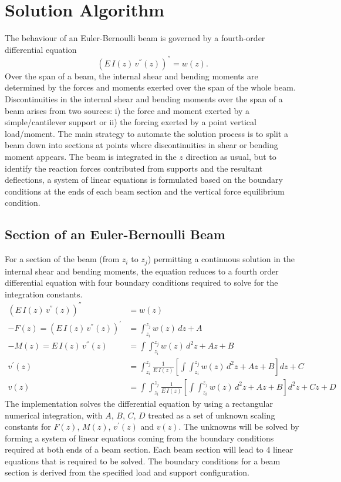 \documentclass[11pt,a4paper]{article}
\begin{document}
\section{Solution Algorithm}
The behaviour of an Euler-Bernoulli beam is governed by a fourth-order differential equation
\begin{equation*}
	\left( E \, I(z) \, v^{''}(z) \right)^{''} = w(z).
\end{equation*}
Over the span of a beam, the internal shear and bending moments are determined by the forces and moments exerted over the span of the whole beam. Discontinuities in the internal shear and bending moments over the span of a beam arises from two sources: i) the force and moment exerted by a simple/cantilever support or ii) the forcing exerted by a point vertical load/moment. The main strategy to automate the solution process is to split a beam down into sections at points where discontinuities in shear or bending moment appears. The beam is integrated in the $z$ direction as usual, but to identify the reaction forces contributed from supports and the resultant deflections, a system of linear equations is formulated based on the boundary conditions at the ends of each beam section and the vertical force equilibrium condition.
\subsection{Section of an Euler-Bernoulli Beam}
For a section of the beam (from $z_i$ to $z_j$) permitting a continuous solution in the internal shear and bending moments, the equation reduces to a fourth order differential equation with four boundary conditions required to solve for the integration constants.
\begin{align}
	 \left( E \, I(z) \, v^{''}(z) \right)^{''} & = w(z)\\
	-F(z) = \left( E \, I(z) \, v^{''}(z) \right)^{'} & = \int_{z_i}^{z_j} w(z) \, dz + A \\
	-M(z) = E \, I(z) \, v^{''}(z) & = \int \int_{z_i}^{z_j} w(z) \, d^2z + Az + B \\
	v^{'}(z) & = \int_{z_i}^{z_j} \frac{1}{E \, I(z)} \left[ \int \int_{z_i}^{z_j} w(z) \, d^2z + Az + B \right] dz  + C \\
	v(z) & = \int \int_{z_i}^{z_j} \frac{1}{E \, I(z)} \left[ \int \int_{z_i}^{z_j} w(z) \, d^2z + Az + B \right] d^2 z  + Cz + D
\end{align}
The implementation solves the differential equation by using a rectangular numerical integration, with $A$, $B$, $C$, $D$ treated as a set of unknown scaling constants for $F(z)$, $M(z)$, $v^{'}(z)$ and $v(z)$. The unknowns will be solved by forming a system of linear equations coming from the boundary conditions required at both ends of a beam section. Each beam section will lead to $4$ linear equations that is required to be solved. The boundary conditions for a beam section is derived from the specified load and support configuration.
\end{document}

